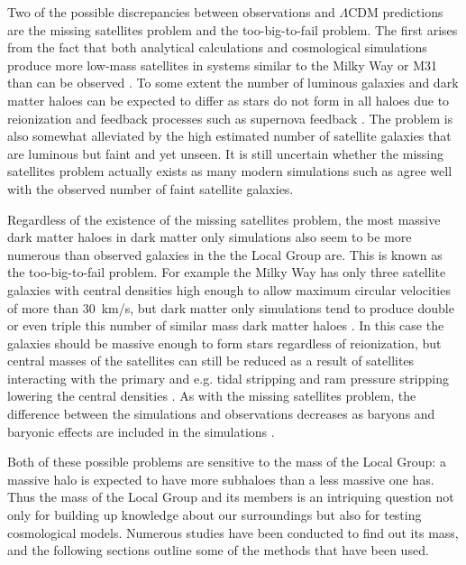 \documentclass[english, oneside]{HYgradu}
\begin{document}
Two of the possible discrepancies between observations and $\Lambda$CDM predictions are the missing satellites problem and the too-big-to-fail problem. The first arises from the fact that both analytical calculations and cosmological simulations produce more low-mass satellites in systems similar to the Milky Way or M31 than can be observed \citep{klypin1999missing}. To some extent the number of luminous galaxies and dark matter haloes can be expected to differ as stars do not form in all haloes due to reionization and feedback processes such as supernova feedback \citep{efstathiou1992suppressing, larson1974effects}. The problem is also somewhat alleviated by the high estimated number of satellite galaxies that are luminous but faint and yet unseen. It is still uncertain whether the missing satellites problem actually exists as many modern simulations such as \citep{sawala2016apostle} agree well with the observed number of faint satellite galaxies.

Regardless of the existence of the missing satellites problem, the most massive dark matter haloes in dark matter only simulations also seem to be more numerous than observed galaxies in the the Local Group are. This is known as the too-big-to-fail problem. For example the Milky Way has only three satellite galaxies with central densities high enough to allow maximum circular velocities of more than 30~km/s, but dark matter only simulations tend to produce double or even triple this number of similar mass dark matter haloes \citep{sawala2016apostle}. In this case the galaxies should be massive enough to form stars regardless of reionization, but central masses of the satellites can still be reduced as a result of satellites interacting with the primary and e.g. tidal stripping and ram pressure stripping lowering the central densities \citep{bullock2017small}. As with the missing satellites problem, the difference between the simulations and observations decreases as baryons and baryonic effects are included in the simulations \citep{sawala2016apostle}.

Both of these possible problems are sensitive to the mass of the Local Group: a massive halo is expected to have more subhaloes than a less massive one has. Thus the mass of the Local Group and its members is an intriquing question not only for building up knowledge about our surroundings but also for testing cosmological models. Numerous studies have been conducted to find out its mass, and the following sections outline some of the methods that have been used.
\end{document}
